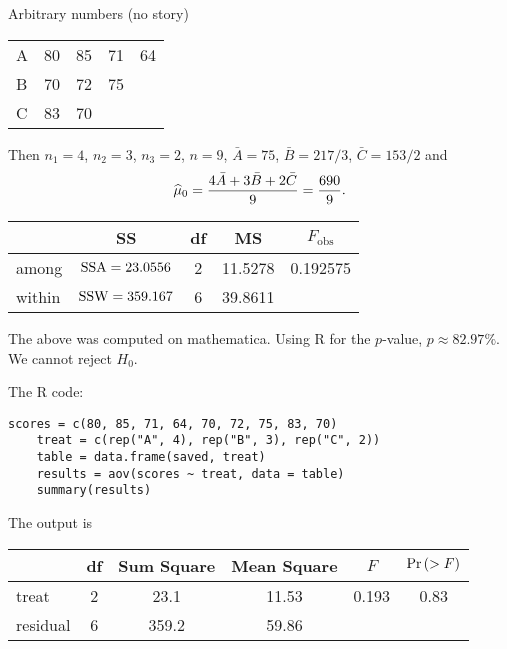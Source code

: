 \example* Arbitrary numbers (no story)\\
\begin{center}
    \begin{tabular}{|l|c c c c|}
         \hline
         A & 80 & 85 & 71 & 64 \\
         B & 70 & 72 & 75 & \\
         C & 83 & 70 & & \\
         \hline
    \end{tabular}
\end{center}
Then $n_1 = 4$, $n_2 = 3$, $n_3 = 2$, $n=9$, $\bar{A} = 75$, $\bar{B} = 217/3$, $\bar{C} = 153/2$ and
$$\widehat{\mu}_0 = \frac{4 \bar A + 3 \bar B + 2 \bar C}{9} = \frac{690}{9}.$$
\begin{center}
    \begin{tabular}{|l|c c c c|}
         \hline
          & SS & df & MS & $F_{\text{obs}}$\\
         \hline
         among & $\operatorname{SSA} = 23.0556$ & 2 & 11.5278 & 0.192575\\
         within & $\operatorname{SSW} = 359.167$ & 6 & 39.8611 & \\
         \hline
    \end{tabular}
\end{center}
The above was computed on mathematica. Using R for the $p$-value, $p \approx 82.97\%$. We cannot reject $H_0$.

\nl The R code:
\begin{lstlisting}[style=sql]
    scores = c(80, 85, 71, 64, 70, 72, 75, 83, 70)
    treat = c(rep("A", 4), rep("B", 3), rep("C", 2))
    table = data.frame(saved, treat)
    results = aov(scores ~ treat, data = table)
    summary(results)
\end{lstlisting}
The output is
\begin{center}
    \begin{tabular}{|l|c c c c c|}
         \hline
          & df & Sum Square & Mean Square & $F$ & $\P{ > F}$\\
         \hline
         treat & 2 & 23.1 & 11.53 & 0.193 & 0.83\\
         residual & 6 & 359.2 & 59.86 & & \\
         \hline
    \end{tabular}
\end{center} 